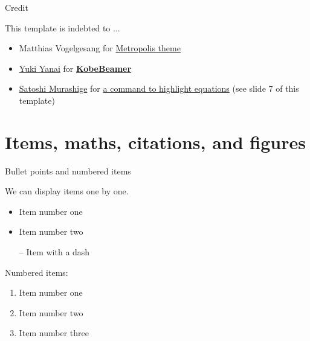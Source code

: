 \documentclass[12pt]{beamer}
\begin{document}
\begin{frame}{Credit}

This template is indebted to ...
\begin{itemize}
    \item Matthias Vogelgesang for \href{https://github.com/matze/mtheme}{Metropolis theme}
    \item \href{http://yukiyanai.github.io/}{Yuki Yanai} for \href{https://github.com/yukiyanai/KobeBeamer}{\textbf{\alert{KobeBeamer}}}
    \item \href{https://www.eqseqs.work/}{Satoshi Murashige} for \href{https://eqseqs.hatenablog.com/entry/2019/10/11/092852}{a command to highlight equations} (see slide 7 of this template)
\end{itemize}
\end{frame}



\section{Items, maths, citations, and figures}

\begin{frame}{Bullet points and numbered items}

We can display items one by one.

\pause

\begin{itemize}[<+->]
    \item Item \alert<2>{number one}
    \item Item \alert<3>{number two}
    \item[--] Item with a \alert<4>{dash}
\end{itemize}

\pause
Numbered items:

\begin{enumerate}[<+->]
    \item Item \alert<6>{number one}
    \item Item \alert<7>{number two}
    \item Item \alert<8>{number three}
\end{enumerate}
\end{frame}
\end{document}
